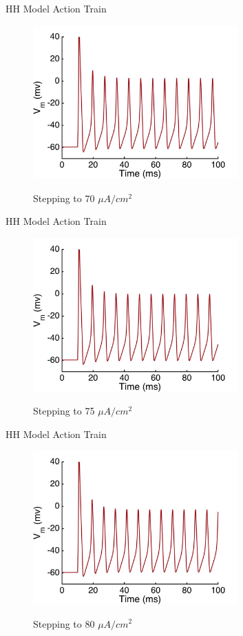 \documentclass{beamer}
\begin{document}
\begin{frame}{HH Model Action Train}
  \begin{figure}
    \centering
    \includegraphics[width = 0.7\textwidth]{./images/current_0_70.jpg}

    Stepping to 70 $\mu A/cm^2$
  \end{figure}
\end{frame}


\begin{frame}{HH Model Action Train}
  \begin{figure}
    \centering
    \includegraphics[width = 0.7\textwidth]{./images/current_0_75.jpg}

    Stepping to 75 $\mu A/cm^2$
  \end{figure}
\end{frame}


\begin{frame}{HH Model Action Train}
  \begin{figure}
    \centering
    \includegraphics[width = 0.7\textwidth]{./images/current_0_80.jpg}

    Stepping to 80 $\mu A/cm^2$
  \end{figure}
\end{frame}
\end{document}
